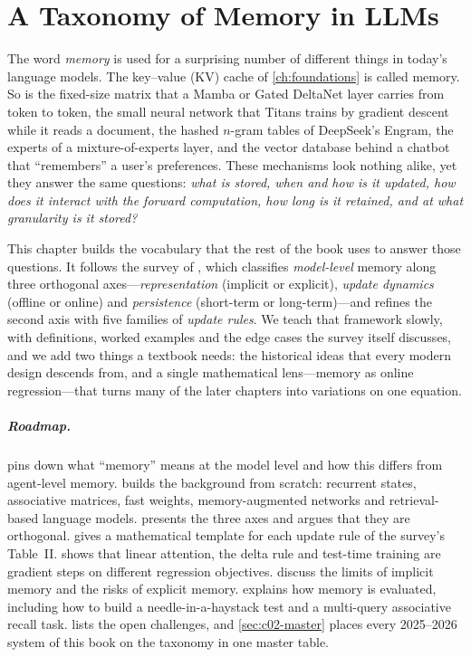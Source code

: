 \chapter{A Taxonomy of Memory in LLMs}\label{ch:taxonomy}

The word \emph{memory} is used for a surprising number of different things in today's language
models. The key--value (KV) cache of \cref{ch:foundations} is called memory. So is the
fixed-size matrix that a Mamba or Gated DeltaNet layer carries from token to token, the small
neural network that Titans trains by gradient descent while it reads a document, the hashed
$n$-gram tables of DeepSeek's Engram, the experts of a mixture-of-experts layer, and the vector
database behind a chatbot that ``remembers'' a user's preferences. These mechanisms look nothing
alike, yet they answer the same questions: \emph{what is stored, when and how is it updated, how
does it interact with the forward computation, how long is it retained, and at what granularity
is it stored?}

This chapter builds the vocabulary that the rest of the book uses to answer those questions. It
follows the survey of \citet{zhoubian2026memory}, which classifies \emph{model-level} memory along
three orthogonal axes---\emph{representation} (implicit or explicit), \emph{update dynamics}
(offline or online) and \emph{persistence} (short-term or long-term)---and refines the second axis
with five families of \emph{update rules}. We teach that framework slowly, with definitions,
worked examples and the edge cases the survey itself discusses, and we add two things a textbook
needs: the historical ideas that every modern design descends from, and a single mathematical
lens---memory as online regression---that turns many of the later chapters into variations on one
equation.

\paragraph{Roadmap.}  pins down what ``memory'' means at the model level and
how this differs from agent-level memory.  builds the background from
scratch: recurrent states, associative matrices, fast weights, memory-augmented networks and
retrieval-based language models.  presents the three axes and argues that they
are orthogonal.  gives a mathematical template for each update rule of the
survey's Table~II.  shows that linear attention, the delta rule and test-time
training are gradient steps on different regression objectives.  discuss the limits of implicit memory and the risks of explicit memory.
 explains how memory is evaluated, including how to build a
needle-in-a-haystack test and a multi-query associative recall task.  lists the
open challenges, and \cref{sec:c02-master} places every 2025--2026 system of this book on the
taxonomy in one master table.

